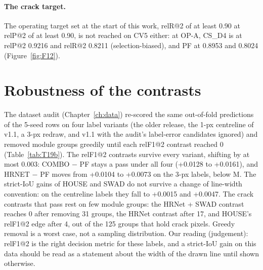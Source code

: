 \paragraph{The crack target.} The operating target set at the start of this work, relR@2 of at least 0.90 at relP@2 of at least
0.90, is not reached on CV5 either: at OP-A, CS\_D4 is at relP@2 0.9216 and relR@2 0.8211 (selection-biased), and PF at 0.8953
and 0.8024 (Figure~\ref{fig:F12}).


\section{Robustness of the contrasts}\label{sec:m-robust}

The dataset audit (Chapter~\ref{ch:data}) re-scored the same out-of-fold predictions of the 5-seed rows on four label variants
(the older release, the 1-px centreline of v1.1, a 3-px redraw, and v1.1 with the audit's label-error candidates ignored) and
removed module groups greedily until each relF1@2 contrast reached 0 (Table~\ref{tab:T19b}). The relF1@2 contrasts survive every
variant, shifting by at most 0.003: COMBO $-$ PF stays a pass under all four (+0.0128 to +0.0161), and HRNET $-$ PF moves from
+0.0104 to +0.0073 on the 3-px labels, below M. The strict-IoU gains of HOUSE and SWAD do not survive a change of line-width
convention: on the centreline labels they fall to +0.0015 and +0.0047. The crack contrasts that pass rest on few module groups:
the HRNet + SWAD contrast reaches 0 after removing 31 groups, the HRNet contrast after 17, and HOUSE's relF1@2 edge after 4, out of
the 125 groups that hold crack pixels. Greedy removal is a worst case, not a sampling distribution. Our reading (judgement):
relF1@2 is the right decision metric for these labels, and a strict-IoU gain on this data should be read as a statement about the
width of the drawn line until shown otherwise.


